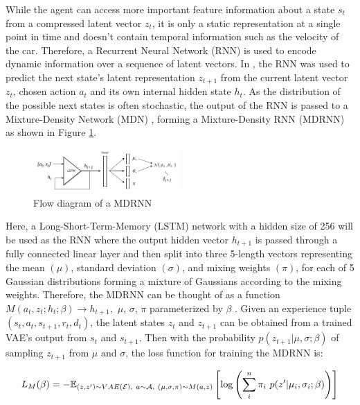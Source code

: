 While the agent can access more important feature information about a state $s_t$ from a compressed latent vector $z_t$, it is only a static representation at a single point in time and doesn't contain temporal information such as the velocity of the car. Therefore, a Recurrent Neural Network (RNN) is used to encode dynamic information over a sequence of latent vectors. In \cite{1.0.0}, the RNN was used to predict the next state's latent representation $z_{t+1}$ from the current latent vector $z_t$, chosen action $a_t$ and its own internal hidden state $h_t$. As the distribution of the possible next states is often stochastic, the output of the RNN is passed to a Mixture-Density Network (MDN) \cite{1.2.1}, forming a Mixture-Density RNN (MDRNN) as shown in Figure \ref{fig:mdrnn}. 

\begin{figure}[h]
	\centering
	\includegraphics[width=0.5\textwidth]{images/mdrnn.png}
	\caption{Flow diagram of a MDRNN}\label{fig:mdrnn}
\end{figure}

Here, a Long-Short-Term-Memory (LSTM) network with a hidden size of 256 will be used as the RNN where the output hidden vector $h_{t+1}$ is passed through a fully connected linear layer and then split into three 5-length vectors representing the mean $(\mu)$, standard deviation $(\sigma)$, and mixing weights $(\pi)$, for each of 5 Gaussian distributions forming a mixture of Gaussians according to the mixing weights. Therefore, the MDRNN can be thought of as a function $M(a_t,z_t;h_t;\beta) \rightarrow h_{t+1},$ \textbf{$\mu$}, \textbf{$\sigma$}, \textbf{$\pi$} parameterized by $\beta$ \cite{1.2.0}. Given an experience tuple $(s_t, a_t, s_{t+1}, r_t, d_t)$, the latent states $z_t$ and $z_{t+1}$ can be obtained from a trained VAE's output from $s_t$ and $s_{t+1}$. Then with the probability $p(z_{t+1}|\mu,\sigma;\beta)$ of sampling $z_{t+1}$ from $\mu$ and $\sigma$, the loss function for training the MDRNN is:

\begin{dmath}
	L_M(\beta) = -\mathbb{E}_{(z,z') \sim VAE(\mathcal{E}),\ a \sim \mathcal{A},\ (\mu,\sigma,\pi) \sim M(a,z)} \\ \left[ \log \left( \sum^n_i \pi_i \ p(z'|\mu_i,\sigma_i;\beta) \right) \right] 
\end{dmath} 

